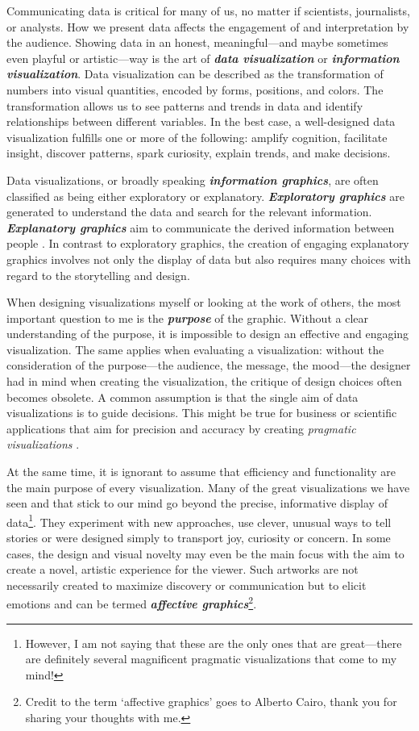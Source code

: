 \documentclass[
]{krantz}
\begin{document}
Communicating data is critical for many of us, no matter if scientists, journalists, or analysts. How we present data affects the engagement of and interpretation by the audience. Showing data in an honest, meaningful---and maybe sometimes even playful or artistic---way is the art of \textbf{\emph{data visualization}} or \textbf{\emph{information visualization}}. Data visualization can be described as the transformation of numbers into visual quantities, encoded by forms, positions, and colors. The transformation allows us to see patterns and trends in data and identify relationships between different variables. In the best case, a well-designed data visualization fulfills one or more of the following: amplify cognition, facilitate insight, discover patterns, spark curiosity, explain trends, and make decisions.

Data visualizations, or broadly speaking \textbf{\emph{information graphics}}, are often classified as being either exploratory or explanatory. \textbf{\emph{Exploratory graphics}} are generated to understand the data and search for the relevant information. \textbf{\emph{Explanatory graphics}} aim to communicate the derived information between people \citep{koponen&hilden2019}. In contrast to exploratory graphics, the creation of engaging explanatory graphics involves not only the display of data but also requires many choices with regard to the storytelling and design.

When designing visualizations myself or looking at the work of others, the most important question to me is the \textbf{\emph{purpose}} of the graphic. Without a clear understanding of the purpose, it is impossible to design an effective and engaging visualization. The same applies when evaluating a visualization: without the consideration of the purpose---the audience, the message, the mood---the designer had in mind when creating the visualization, the critique of design choices often becomes obsolete. A common assumption is that the single aim of data visualizations is to guide decisions. This might be true for business or scientific applications that aim for precision and accuracy by creating \emph{pragmatic visualizations} \citep{kosara2007}.

At the same time, it is ignorant to assume that efficiency and functionality are the main purpose of every visualization. Many of the great visualizations we have seen and that stick to our mind go beyond the precise, informative display of data\footnote{However, I am not saying that these are the only ones that are great---there are definitely several magnificent pragmatic visualizations that come to my mind!}. They experiment with new approaches, use clever, unusual ways to tell stories or were designed simply to transport joy, curiosity or concern. In some cases, the design and visual novelty may even be the main focus with the aim to create a novel, artistic experience for the viewer. Such artworks are not necessarily created to maximize discovery or communication but to elicit emotions and can be termed \textbf{\emph{affective graphics}}\footnote{Credit to the term `affective graphics' goes to Alberto Cairo, thank you for sharing your thoughts with me.}.
\end{document}
